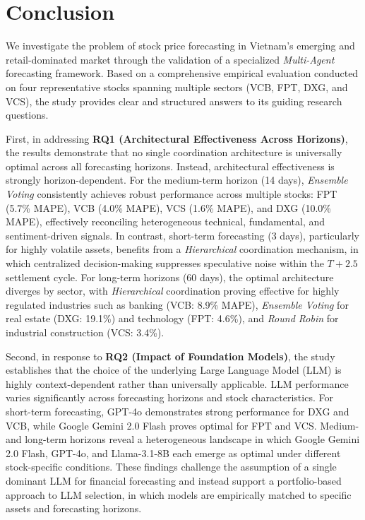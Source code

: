 \documentclass{ieeeaccess}
\begin{document}
\section{Conclusion}

We investigate the problem of stock price forecasting in Vietnam’s emerging and retail-dominated market through the validation of a specialized \textit{Multi-Agent} forecasting framework. Based on a comprehensive empirical evaluation conducted on four representative stocks spanning multiple sectors (VCB, FPT, DXG, and VCS), the study provides clear and structured answers to its guiding research questions.

First, in addressing \textbf{RQ1 (Architectural Effectiveness Across Horizons)}, the results demonstrate that no single coordination architecture is universally optimal across all forecasting horizons. Instead, architectural effectiveness is strongly horizon-dependent. For the medium-term horizon (14 days), \textit{Ensemble Voting} consistently achieves robust performance across multiple stocks: FPT (5.7\% MAPE), VCB (4.0\% MAPE), VCS (1.6\% MAPE), and DXG (10.0\% MAPE), effectively reconciling heterogeneous technical, fundamental, and sentiment-driven signals. In contrast, short-term forecasting (3 days), particularly for highly volatile assets, benefits from a \textit{Hierarchical} coordination mechanism, in which centralized decision-making suppresses speculative noise within the $T+2.5$ settlement cycle. For long-term horizons (60 days), the optimal architecture diverges by sector, with \textit{Hierarchical} coordination proving effective for highly regulated industries such as banking (VCB: 8.9\% MAPE), \textit{Ensemble Voting} for real estate (DXG: 19.1\%) and technology (FPT: 4.6\%), and \textit{Round Robin} for industrial construction (VCS: 3.4\%).

Second, in response to \textbf{RQ2 (Impact of Foundation Models)}, the study establishes that the choice of the underlying Large Language Model (LLM) is highly context-dependent rather than universally applicable. LLM performance varies significantly across forecasting horizons and stock characteristics. For short-term forecasting, GPT-4o demonstrates strong performance for DXG and VCB, while Google Gemini 2.0 Flash proves optimal for FPT and VCS. Medium- and long-term horizons reveal a heterogeneous landscape in which Google Gemini 2.0 Flash, GPT-4o, and Llama-3.1-8B each emerge as optimal under different stock-specific conditions. These findings challenge the assumption of a single dominant LLM for financial forecasting and instead support a portfolio-based approach to LLM selection, in which models are empirically matched to specific assets and forecasting horizons.
\end{document}
